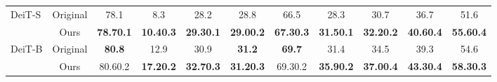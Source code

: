 \documentclass{article}
\begin{document}
\begin{table}[h!]
\begin{center}
{\begin{tabular}{@{}l@{~~}c@{~~~}c@{~~~}c@{~~~}c@{~~~}c@{~~~}c@{~~~}c@{~~~~}c@{~~~}c@{~~~}c@{}}
\midrule
\multirow{2}{*}{\small DeiT-S }  &\small{Original} & 78.1 & 8.3 & 28.2 & 28.8 & 66.5 & 28.3 & 30.7 & 36.7 & 51.6 \\
&\small{Ours} & \textbf{78.70.1} & \textbf{10.40.3} & \textbf{29.30.1} & \textbf{29.00.2} & \textbf{67.30.3} & \textbf{31.50.1} & \textbf{32.20.2} & \textbf{40.60.4} & \textbf{55.60.4} \\
\midrule
\multirow{2}{*}{\small DeiT-B }  &\small{Original} & \textbf{80.8} & 12.9 & 30.9 & \textbf{31.2} & \textbf{69.7} & 31.4 & 34.5 & 39.3 & 54.6 \\
&\small{Ours} & 80.60.2 & \textbf{17.20.2} & \textbf{32.70.3} & \textbf{31.20.3} & 69.30.2 & \textbf{35.90.2} & \textbf{37.00.4} & \textbf{43.30.4} & \textbf{58.30.3} \\

        \bottomrule
    \end{tabular}
    }
    \smallskip
    \smallskip
    \label{table:seeds_top1}
    \end{center}
    \vspace{-24px}
\end{table}
\end{document}
